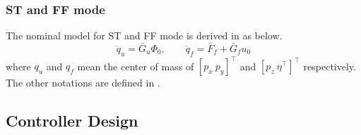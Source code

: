 \documentclass[letterpaper, 10 pt, conference]{ieeeconf}  %
\theoremstyle{definition}
\begin{document}
\subsubsection{ST and FF mode}
The nominal model for ST and FF mode is derived in \cite{lee2020aerial_2} as below.
\begin{equation} \label{eq: actual and nominal model for FF}
        \ddot{q}_u = \bar{G}_u \Phi_0, \qquad \ddot{q}_f = \bar{F}_f + \bar{G}_f u_0
\end{equation}
where $q_u$ and $q_f$ mean the center of mass of $[p_x \ p_y]^{\top}$ and $[p_z \ \eta^{\top}]^{\top}$ respectively. The other notations are defined in \cite{lee2020aerial_2}.

\subsection{Controller Design}
\end{document}
